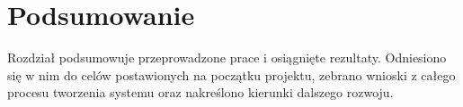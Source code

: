 \chapter{Podsumowanie}
\label{cha:podsumowanie}

Rozdział podsumowuje przeprowadzone prace i osiągnięte rezultaty. Odniesiono się w nim do celów postawionych na początku projektu, zebrano wnioski z całego procesu tworzenia systemu oraz nakreślono kierunki dalszego rozwoju.



